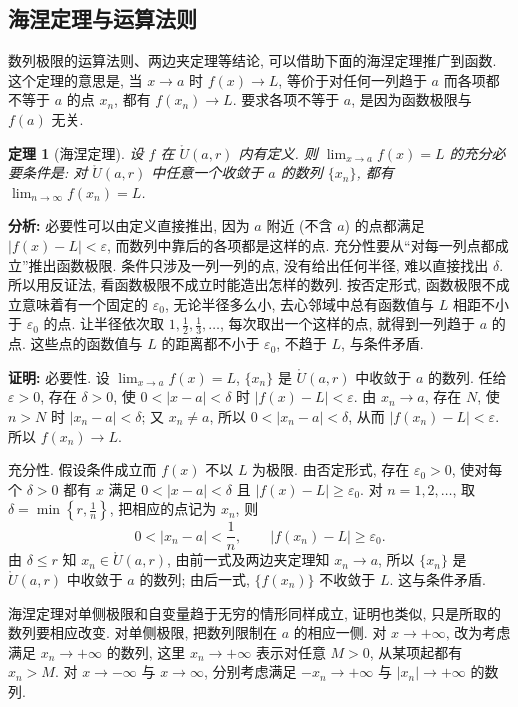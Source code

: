 \documentclass[UTF8,openany]{ctexbook}
\theoremstyle{chinesetextbook}
\newtheorem{theorem}{定理}[section]
\newenvironment{cnproof}{\par\indent\textbf{证明:} \ignorespaces}{\par}
\begin{document}
\subsection{海涅定理与运算法则}
数列极限的运算法则、两边夹定理等结论, 可以借助下面的海涅定理推广到函数. 这个定理的意思是, 当 $x\to a$ 时 $f(x)\to L$, 等价于对任何一列趋于 $a$ 而各项都不等于 $a$ 的点 $x_n$, 都有 $f(x_n)\to L$. 要求各项不等于 $a$, 是因为函数极限与 $f(a)$ 无关.
\begin{theorem}[海涅定理]
设 $f$ 在 $\mathring U(a,r)$ 内有定义. 则 $\displaystyle\lim_{x\to a}f(x)=L$ 的充分必要条件是: 对 $\mathring U(a,r)$ 中任意一个收敛于 $a$ 的数列 $\{x_n\}$, 都有 $\displaystyle\lim_{n\to\infty}f(x_n)=L$.
\end{theorem}
\par\indent\textbf{分析:} 必要性可以由定义直接推出, 因为 $a$ 附近 (不含 $a$) 的点都满足 $|f(x)-L|<\varepsilon$, 而数列中靠后的各项都是这样的点. 充分性要从“对每一列点都成立”推出函数极限. 条件只涉及一列一列的点, 没有给出任何半径, 难以直接找出 $\delta$. 所以用反证法, 看函数极限不成立时能造出怎样的数列. 按否定形式, 函数极限不成立意味着有一个固定的 $\varepsilon_0$, 无论半径多么小, 去心邻域中总有函数值与 $L$ 相距不小于 $\varepsilon_0$ 的点. 让半径依次取 $\displaystyle1,\frac12,\frac13,\ldots$, 每次取出一个这样的点, 就得到一列趋于 $a$ 的点. 这些点的函数值与 $L$ 的距离都不小于 $\varepsilon_0$, 不趋于 $L$, 与条件矛盾.
\begin{cnproof}
必要性. 设 $\displaystyle\lim_{x\to a}f(x)=L$, $\{x_n\}$ 是 $\mathring U(a,r)$ 中收敛于 $a$ 的数列. 任给 $\varepsilon>0$, 存在 $\delta>0$, 使 $0<|x-a|<\delta$ 时 $|f(x)-L|<\varepsilon$. 由 $x_n\to a$, 存在 $N$, 使 $n>N$ 时 $|x_n-a|<\delta$; 又 $x_n\ne a$, 所以 $0<|x_n-a|<\delta$, 从而 $|f(x_n)-L|<\varepsilon$. 所以 $f(x_n)\to L$.

充分性. 假设条件成立而 $f(x)$ 不以 $L$ 为极限. 由否定形式, 存在 $\varepsilon_0>0$, 使对每个 $\delta>0$ 都有 $x$ 满足 $0<|x-a|<\delta$ 且 $|f(x)-L|\ge\varepsilon_0$. 对 $n=1,2,\ldots$, 取 $\displaystyle\delta=\min\left\{r,\frac1n\right\}$, 把相应的点记为 $x_n$, 则
\[
0<|x_n-a|<\frac1n,\qquad|f(x_n)-L|\ge\varepsilon_0.
\]
由 $\delta\le r$ 知 $x_n\in\mathring U(a,r)$, 由前一式及两边夹定理知 $x_n\to a$, 所以 $\{x_n\}$ 是 $\mathring U(a,r)$ 中收敛于 $a$ 的数列; 由后一式, $\{f(x_n)\}$ 不收敛于 $L$. 这与条件矛盾.
\end{cnproof}
海涅定理对单侧极限和自变量趋于无穷的情形同样成立, 证明也类似, 只是所取的数列要相应改变. 对单侧极限, 把数列限制在 $a$ 的相应一侧. 对 $x\to+\infty$, 改为考虑满足 $x_n\to+\infty$ 的数列, 这里 $x_n\to+\infty$ 表示对任意 $M>0$, 从某项起都有 $x_n>M$. 对 $x\to-\infty$ 与 $x\to\infty$, 分别考虑满足 $-x_n\to+\infty$ 与 $|x_n|\to+\infty$ 的数列.
\end{document}
